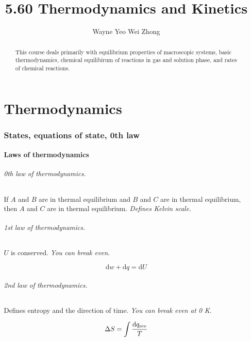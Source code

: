 \documentclass{article}
\title{5.60 Thermodynamics and Kinetics}
\author{Wayne Yeo Wei Zhong}
\numberwithin{theorem}{section}
\numberwithin{corollary}{section}
\numberwithin{postulate}{section}
\numberwithin{lemma}{section}
\numberwithin{definition}{section}
\begin{document}
\maketitle

\begin{abstract}
  This course deals primarily with equilibrium properties of macroscopic
  systems, basic thermodynamics, chemical equilibirum of reactions in gas and
  solution phase, and rates of chemical reactions.
\end{abstract}

\tableofcontents
\newpage

\part{Thermodynamics}

\setcounter{section}{0}
\section{States, equations of state, 0th law}

\subsection{Laws of thermodynamics}

\paragraph{0th law of thermodynamics.} If $A$ and $B$ are in thermal equilibrium
and $B$ and $C$ are in thermal equilibrium, then $A$ and $C$ are in thermal 
equilibrium. \textit{Defines Kelvin scale.}

\paragraph{1st law of thermodynamics.} $U$ is conserved. \textit{You can break
even.}

\begin{equation}
  \mathrm{d}w + \mathrm{d}q = \mathrm{d}U
\end{equation}

\paragraph{2nd law of thermodynamics.} Defines entropy and the direction of
time. \textit{You can break even at 0 K}.

\begin{equation}
  \Delta S = \int \frac{\textnormal{d} q_{\mathrm{rev}}}{T}
\end{equation}
\end{document}
